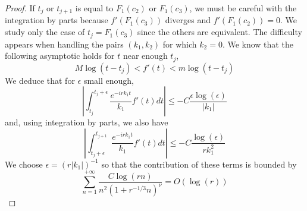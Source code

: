 \documentclass[12pt]{amsart}
\numberwithin{equation}{subsection}
\theoremstyle{definition}
\theoremstyle{plain}
\begin{document}
\begin{proof}
If $t_j$ or $t_{j+1}$ is equal to $F_1(c_2)$ or $F_1(c_3)$, we must be careful with the integration by parts because $f'(F_1(c_3))$ diverges and $f'(F_1(c_2))=0$.
We study only the case of $t_j=F_1(c_3)$ since the others are equivalent.
The difficulty appears when handling the pairs $(k_1,k_2)$ for which $k_2=0$.
We know that the following asymptotic holds for $t$ near enough $t_j$,
\[
M \log(t-t_j) < f'(t) < m \log(t-t_j)
\]
We deduce that for $\epsilon$ small enough,
\[
\left| \int_{t_j}^{t_j+\epsilon} \frac{e^{-ir k_1 t}}{k_1} f'(t) dt \right| \leq  -C \frac{\epsilon \log(\epsilon)}{|k_1|}
\]
and, using integration by parts, we also have
\[
\left| \int_{t_{j}+\epsilon}^{t_{j+1}} \frac{e^{-ir k_1 t}}{k_1} f'(t) dt \right| \leq -C \frac{\log(\epsilon)}{r k_1^2}
\]
We choose $\epsilon=(r |k_1|)^{-1}$ so that the contribution of these terms is bounded by
\[
\sum_{n=1}^{+\infty} \frac{C \log(r n)}{ n^2 (1+r^{-1/3} n)^\nu} = O(\log(r) )
\]
\end{proof}
\end{document}

